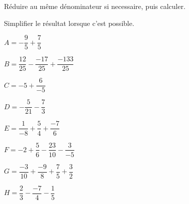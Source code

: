 \begin{exercice*}
    Réduire au même dénominateur si necessaire, puis calculer.

    Simplifier le résultat lorsque c'est possible.
    \begin{list}{}{}            
        \begin{spacing}{2}                
            \item $A=-\dfrac{9}{5}+\dfrac{7}{5}$
            \item $B=\dfrac{12}{25}-\dfrac{-17}{25}+\dfrac{-133}{25}$
            \item $C=-5+\dfrac{6}{-5}$
            \item $D=-\dfrac{5}{21}-\dfrac{7}{3}$
            \item $E=\dfrac{1}{-8}+\dfrac{5}{4}+\dfrac{-7}{6}$
            \item $F=-2+\dfrac{5}{6}-\dfrac{23}{10}-\dfrac{3}{-5}$
            \item $G=\dfrac{-3}{10}+\dfrac{-9}{8}+\dfrac{7}{5}+\dfrac{3}{2}$
            \item $H=\dfrac{2}{3}-\dfrac{-7}{4}-\dfrac{1}{5}$
        \end{spacing}
    \end{list}        
\end{exercice*}
